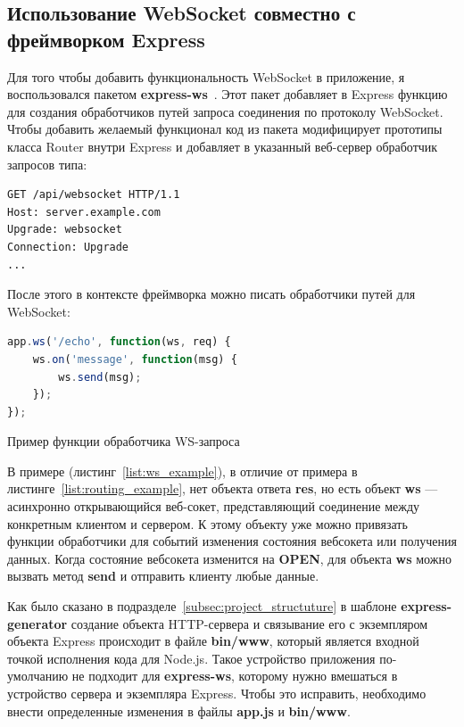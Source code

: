 \subsection{Использование WebSocket совместно с фреймворком Express}
Для того чтобы добавить функциональность WebSocket в приложение, я воспользовался пакетом \textbf{express-ws}~\autocite{express-ws}. Этот пакет добавляет в Express функцию для создания обработчиков путей запроса соединения по протоколу WebSocket. Чтобы добавить желаемый функционал код из пакета модифицирует прототипы класса Router внутри Express и добавляет в указанный веб-сервер обработчик запросов типа:
\begin{lstlisting}[language]
GET /api/websocket HTTP/1.1
Host: server.example.com
Upgrade: websocket
Connection: Upgrade
...
\end{lstlisting}
После этого в контексте фреймворка можно писать обработчики путей для WebSocket:
\begin{ListingEnv}[H]
	\begin{lstlisting}[language=JavaScript]
app.ws('/echo', function(ws, req) {
	ws.on('message', function(msg) {
		ws.send(msg);
	});
});
	\end{lstlisting}
	\caption{Пример функции обработчика WS-запроса}
	\label{list:ws_example}
\end{ListingEnv}
В примере (листинг~\ref{list:ws_example}), в отличие от примера в листинге~\ref{list:routing_example}, нет объекта ответа \textbf{res}, но есть объект \textbf{ws} --- асинхронно открывающийся веб-сокет, представляющий соединение между конкретным клиентом и сервером. К этому объекту уже можно привязать функции обработчики для событий изменения состояния вебсокета или получения данных. Когда состояние вебсокета изменится на \textbf{OPEN}, для объекта \textbf{ws} можно вызвать метод \textbf{send} и отправить клиенту любые данные.   

Как было сказано в подразделе~\ref{subsec:project_structuture} в шаблоне \textbf{express-generator} создание объекта HTTP-сервера и связывание его с экземпляром объекта Express происходит в файле \textbf{bin/www}, который является входной точкой исполнения кода для Node.js. Такое устройство приложения по-умолчанию не подходит для \textbf{express-ws}, которому нужно вмешаться в устройство сервера и экземпляра Express. Чтобы это исправить, необходимо внести определенные изменения в файлы \textbf{app.js} и \textbf{bin/www}.

